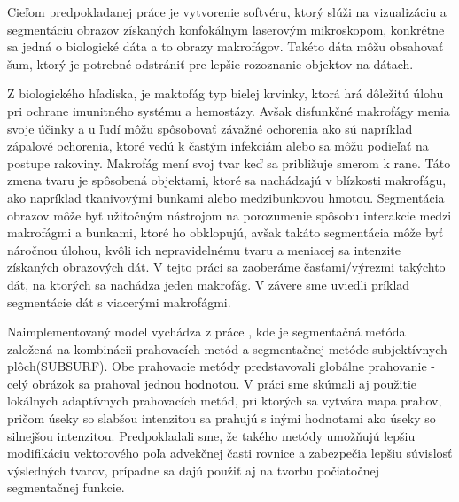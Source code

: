 \documentclass[a4paper,11pt,oneside]{article}%
\begin{document}
Cieľom predpokladanej práce je vytvorenie softvéru, ktorý slúži na vizualizáciu a segmentáciu obrazov získaných konfokálnym laserovým mikroskopom, konkrétne sa jedná o biologické dáta a to obrazy makrofágov. Takéto dáta môžu obsahovať šum, ktorý je potrebné odstrániť pre lepšie rozoznanie objektov na dátach. 
 
Z biologického hľadiska, je maktofág typ bielej krvinky, ktorá hrá dôležitú úlohu pri ochrane imunitného systému a hemostázy. Avšak disfunkčné makrofágy menia svoje účinky a u ľudí môžu spôsobovať závažné ochorenia ako sú napríklad  zápalové ochorenia, ktoré vedú k častým infekciám alebo sa môžu podieľať na postupe rakoviny. Makrofág mení svoj tvar keď sa približuje smerom k rane. Táto zmena tvaru je spôsobená objektami, ktoré sa nachádzajú v blízkosti makrofágu, ako napríklad tkanivovými bunkami alebo medzibunkovou hmotou.
Segmentácia obrazov môže byť užitočným nástrojom na porozumenie spôsobu interakcie medzi makrofágmi a bunkami, ktoré ho obklopujú, avšak takáto segmentácia môže byť náročnou úlohou, kvôli ich nepravidelnému tvaru a meniacej sa intenzite získaných obrazových dát. V tejto práci sa zaoberáme časťami/výrezmi takýchto dát, na ktorých sa nachádza jeden makrofág. V závere sme uviedli príklad 
segmentácie dát s  viacerými makrofágmi.



Naimplementovaný model vychádza z práce \cite{sora}, kde je segmentačná metóda založená na kombinácii prahovacích metód a segmentačnej metóde subjektívnych plôch(SUBSURF). Obe prahovacie metódy predstavovali globálne prahovanie - celý obrázok sa prahoval jednou hodnotou. V práci sme  skúmali aj použitie lokálnych adaptívnych prahovacích metód, pri ktorých sa vytvára mapa prahov, pričom úseky so slabšou intenzitou sa prahujú s inými hodnotami ako úseky so silnejšou intenzitou. Predpokladali sme, že takého metódy umožňujú lepšiu modifikáciu vektorového poľa advekčnej časti rovnice a zabezpečia lepšiu súvislosť výsledných tvarov, prípadne sa dajú použiť aj na tvorbu počiatočnej segmentačnej funkcie.
\end{document}
